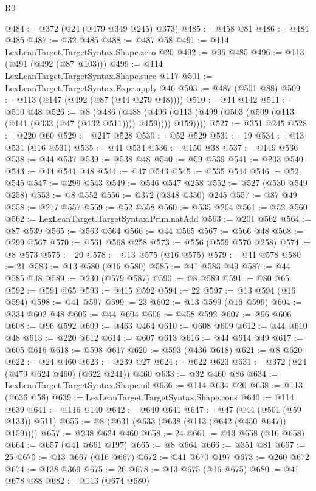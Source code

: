 \begin{lexlean}{R0}
\begin{coremodule}
@484 := @372 (@24 (@479 @349 @245) @373)
@485 := @458 @81
@486 := @484 @485
@487 := @32 @485
@488 := @487 @58
@491 := @114 LexLeanTarget.TargetSyntax.Shape.zero @20
@492 := @96 @485
@496 := @113 (@491 (@492 (@87 @103)))
@499 := @114 LexLeanTarget.TargetSyntax.Shape.succ @117
@501 := LexLeanTarget.TargetSyntax.Expr.apply @46
@503 := @487 (@501 @88)
@509 := @113 (@147 (@492 (@87 (@44 @279 @48))))
@510 := @44 @142
@511 := @510 @48
@526 := @8
    (@486
      (@488 (@496 (@113 (@499 (@503 (@509 (@113 (@141 (@333 (@47 (@132 @511)))) @159)))) @159))))
@527 := @351 @245
@528 := @220 @60
@529 := @217 @528
@530 := @52 @529
@531 := 19
@534 := @13 @531 (@16 @531)
@535 := @41 @534
@536 := @150 @38
@537 := @149 @536
@538 := @44 @537
@539 := @538 @48
@540 := @59 @539
@541 := @203 @540
@543 := @44 @541 @48
@544 := @47 @543
@545 := @535 @544
@546 := @52 @545
@547 := @299 @543
@549 := @546 @547 @258
@552 := @527 (@530 @549 @258)
@553 := @8 @552
@556 := @372 (@348 @350) @245
@557 := @87 @49
@558 := @217 @557
@559 := @52 @558
@560 := @535 @204
@561 := @52 @560
@562 := LexLeanTarget.TargetSyntax.Prim.natAdd
@563 := @201 @562
@564 := @87 @539
@565 := @563 @564
@566 := @44 @565
@567 := @566 @48
@568 := @299 @567
@570 := @561 @568 @258
@573 := @556 (@559 @570 @258)
@574 := @8 @573
@575 := 20
@578 := @13 @575 (@16 @575)
@579 := @41 @578
@580 := 21
@583 := @13 @580 (@16 @580)
@585 := @41 @583 @49
@587 := @44 @585 @48
@589 := @230 (@579 @587)
@590 := @8 @589
@591 := @80 @65
@592 := @591 @65
@593 := @415 @592
@594 := 22
@597 := @13 @594 (@16 @594)
@598 := @41 @597
@599 := 23
@602 := @13 @599 (@16 @599)
@604 := @334 @602 @48
@605 := @44 @604
@606 := @458 @592
@607 := @96 @606
@608 := @96 @592
@609 := @463 @464
@610 := @608 @609
@612 := @44 @610 @48
@613 := @220 @612
@614 := @607 @613
@616 := @44 @614 @49
@617 := @605 @616
@618 := @598 @617
@620 := @593 (@436 @618)
@621 := @8 @620
@622 := @24 @460
@623 := @239 @27
@624 := @622 @623
@631 := @372 (@24 (@479 @624 @460) (@622 @241)) @460
@633 := @32 @460 @86
@634 := LexLeanTarget.TargetSyntax.Shape.nil
@636 := @114 @634 @20
@638 := @113 (@636 @58)
@639 := LexLeanTarget.TargetSyntax.Shape.cons
@640 := @114 @639
@641 := @116 @140
@642 := @640 @641
@647 := @47 (@44 (@501 (@59 @133)) @511)
@655 := @8 (@631 (@633 (@638 (@113 (@642 (@450 @647)) @159))))
@657 := @238 @624 @460
@658 := 24
@661 := @13 @658 (@16 @658)
@664 := @657 (@41 @661 @197)
@665 := @8 @664
@666 := @351 @81
@667 := 25
@670 := @13 @667 (@16 @667)
@672 := @41 @670 @197
@673 := @260 @672
@674 := @138 @369
@675 := 26
@678 := @13 @675 (@16 @675)
@680 := @41 @678 @88
@682 := @113 (@674 @680)

\end{coremodule}
\end{lexlean}
